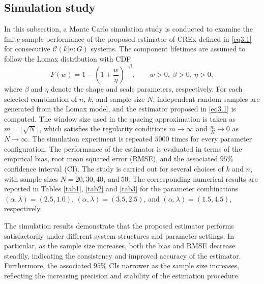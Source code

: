 \documentclass[12pt,a4paper]{article}
\numberwithin{equation}{section}
\begin{document}
\subsection{Simulation study}
In this subsection, a Monte Carlo simulation study is conducted to examine the finite-sample performance of the proposed estimator of CREx defined in \eqref{eq3.1} for consecutive $\mathcal C(k|n{:}G)$ systems. The component lifetimes are assumed to follow the Lomax distribution with CDF
\begin{equation*}
F(w)=1-\left(1+\frac{w}{\eta}\right)^{-\beta}, \qquad 
w>0,\ \beta>0,\ \eta>0,
\end{equation*}
where $\beta$ and $\eta$ denote the shape and scale parameters, respectively.
For each selected combination of $n$, $k$, and sample size $N$, independent random samples are generated from the Lomax model, and the estimator proposed in \eqref{eq3.1} is computed. The window size used in the spacing approximation is taken as $m=\lfloor \sqrt{N}\rfloor$, which satisfies the regularity conditions $m\to\infty$ and $\frac{m}{N}\to0$ as $N\to\infty$.
The simulation experiment is repeated $5000$ times for every parameter configuration. The performance of the estimator is evaluated in terms of the empirical bias, root mean squared error (RMSE), and the associated $95\%$ confidence interval (CI). The study is carried out for several choices of $k$ and $n$, with sample sizes $N=20,30,40,~\text{and}~50$. The corresponding numerical results are reported in Tables \ref{tab1}, \ref{tab2} and \ref{tab3} for the parameter combinations
$(\alpha,\lambda)=(2.5,1.0)$,
$(\alpha,\lambda)=(3.5,2.5)$, and
$(\alpha,\lambda)=(1.5,4.5)$, respectively.

The simulation results demonstrate that the proposed estimator performs satisfactorily under different system structures and parameter settings. In particular, as the sample size increases, both the  bias and RMSE decrease steadily, indicating the consistency and improved accuracy of the estimator. Furthermore, the associated $95\%$ CIs narrower as the sample size increases, reflecting the increasing precision and stability of the estimation procedure.
\newpage
\end{document}
